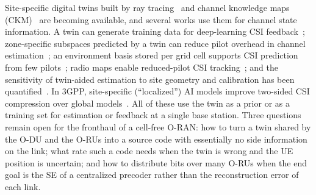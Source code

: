 \documentclass[journal]{IEEEtran}
\begin{document}
Site-specific digital twins built by ray tracing~\cite{hoydis2023sionnart,alkhateeb2023dt} and channel knowledge maps (CKM)~\cite{zeng2024ckm} are becoming available, and several works use them for channel state information. A twin can generate training data for deep-learning CSI feedback~\cite{luo2025dtfeedback,luo2026calibration}; zone-specific subspaces predicted by a twin can reduce pilot overhead in channel estimation~\cite{alikhani2025zone}; an environment basis stored per grid cell supports CSI prediction from few pilots~\cite{cai2025ecb}; radio maps enable reduced-pilot CSI tracking~\cite{zheng2025radiomap}; and the sensitivity of twin-aided estimation to site geometry and calibration has been quantified~\cite{delmoro2026geometry}. In 3GPP, site-specific (``localized'') AI models improve two-sided CSI compression over global models~\cite{3gpp38843}. All of these use the twin as a prior or as a training set for estimation or feedback at a single base station. Three questions remain open for the fronthaul of a cell-free O-RAN: how to turn a twin shared by the O-DU and the O-RUs into a source code with essentially no side information on the link; what rate such a code needs when the twin is wrong and the UE position is uncertain; and how to distribute bits over many O-RUs when the end goal is the SE of a centralized precoder rather than the reconstruction error of each link.
\end{document}
